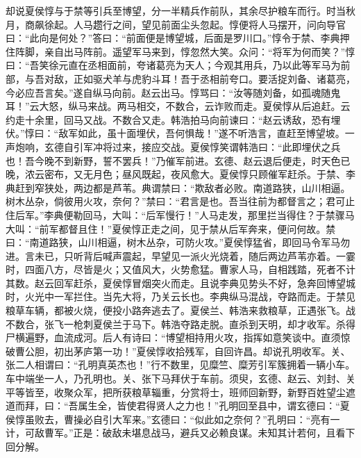 却说夏侯惇与于禁等引兵至博望，分一半精兵作前队，其余尽护粮车而行。时当秋月，商飙徐起。人马趱行之间，望见前面尘头忽起。惇便将人马摆开，问向导官曰：“此向是何处？”答曰：“前面便是博望城，后面是罗川口。”惇令于禁、李典押住阵脚，亲自出马阵前。遥望军马来到，惇忽然大笑。众问：“将军为何而笑？”惇曰：“吾笑徐元直在丞相面前，夸诸葛亮为天人；今观其用兵，乃以此等军马为前部，与吾对敌，正如驱犬羊与虎豹斗耳！吾于丞相前夸口。要活捉刘备、诸葛亮，今必应吾言矣。”遂自纵马向前。赵云出马。惇骂曰：“汝等随刘备，如孤魂随鬼耳！”云大怒，纵马来战。两马相交，不数合，云诈败而走。夏侯惇从后追赶。云约走十余里，回马又战。不数合又走。韩浩拍马向前谏曰：“赵云诱敌，恐有埋伏。”惇曰：“敌军如此，虽十面埋伏，吾何惧哉！”遂不听浩言，直赶至博望坡。一声炮响，玄德自引军冲将过来，接应交战。夏侯惇笑谓韩浩曰：“此即埋伏之兵也！吾今晚不到新野，誓不罢兵！”乃催军前进。玄德、赵云退后便走，时天色已晚，浓云密布，又无月色；昼风既起，夜风愈大。夏侯惇只顾催军赶杀。于禁、李典赶到窄狭处，两边都是芦苇。典谓禁曰：“欺敌者必败。南道路狭，山川相逼。树木丛杂，倘彼用火攻，奈何？”禁曰：“君言是也。吾当往前为都督言之；君可止住后军。”李典便勒回马，大叫：“后军慢行！”人马走发，那里拦当得住？于禁骤马大叫：“前军都督且住！”夏侯惇正走之间，见于禁从后军奔来，便问何故。禁曰：“南道路狭，山川相逼，树木丛杂，可防火攻。”夏侯惇猛省，即回马令军马勿进。言未已，只听背后喊声震起，早望见一派火光烧着，随后两边芦苇亦着。一霎时，四面八方，尽皆是火；又值风大，火势愈猛。曹家人马，自相践踏，死者不计其数。赵云回军赶杀，夏侯惇冒烟突火而走。且说李典见势头不好，急奔回博望城时，火光中一军拦住。当先大将，乃关云长也。李典纵马混战，夺路而走。于禁见粮草车辆，都被火烧，便投小路奔逃去了。夏侯兰、韩浩来救粮草，正遇张飞。战不数合，张飞一枪刺夏侯兰于马下。韩浩夺路走脱。直杀到天明，却才收军。杀得尸横遍野，血流成河。后人有诗曰：“博望相持用火攻，指挥如意笑谈中。直须惊破曹公胆，初出茅庐第一功！”夏侯惇收拾残军，自回许昌。却说孔明收军。关、张二人相谓曰：“孔明真英杰也！”行不数里，见糜竺、糜芳引军簇拥着一辆小车。车中端坐一人，乃孔明也。关、张下马拜伏于车前。须臾，玄德、赵云、刘封、关平等皆至，收聚众军，把所获粮草辎重，分赏将士，班师回新野，新野百姓望尘遮道而拜，曰：“吾属生全，皆使君得贤人之力也！”孔明回至县中，谓玄德曰：“夏侯惇虽败去，曹操必自引大军来。”玄德曰：“似此如之奈何？”孔明曰：“亮有一计，可敌曹军。”正是：破敌未堪息战马，避兵又必赖良谋。未知其计若何，且看下回分解。